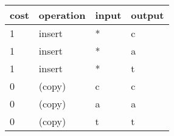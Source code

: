 \documentclass[aspectratio=169]{beamer}
\begin{document}
\begin{frame}[shrink=15]
\vfill

\bigskip

\begin{tabular}{ll||l|l}
cost & operation & input & output\\\hline\hline
1 & insert  &*&c\\\hline
1 & insert  &*&a\\\hline
1 & insert  &*&t\\\hline
0 & (copy)  &c&c\\\hline
0 & (copy)  &a&a\\\hline
0 & (copy)  &t&t\\\hline

\end{tabular}
\end{frame}
\end{document}
